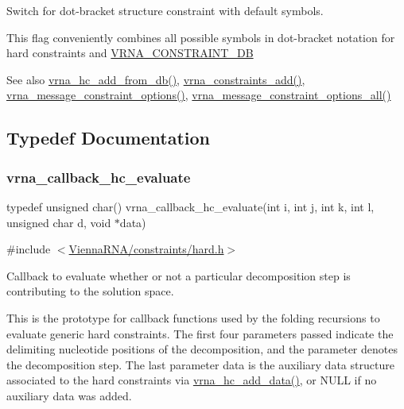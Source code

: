 Switch for dot-\/bracket structure constraint with default symbols. 

This flag conveniently combines all possible symbols in dot-\/bracket notation for hard constraints and \mbox{\hyperlink{group__hard__constraints_ga4bfc2f15c4f261c62a11af9d2aa80c90}{V\+R\+N\+A\+\_\+\+C\+O\+N\+S\+T\+R\+A\+I\+N\+T\+\_\+\+DB}}

\begin{DoxySeeAlso}{See also}
\mbox{\hyperlink{group__hard__constraints_ga5b4de3247b67358080c176b94591a8e6}{vrna\+\_\+hc\+\_\+add\+\_\+from\+\_\+db()}}, \mbox{\hyperlink{group__constraints_ga35a401f680969a556858a8dd5f1d07cc}{vrna\+\_\+constraints\+\_\+add()}}, \mbox{\hyperlink{group__constraints_gaa1f20b53bf09ac2e6b0dbb13f7d89670}{vrna\+\_\+message\+\_\+constraint\+\_\+options()}}, \mbox{\hyperlink{group__constraints_gaec7e13fa0465c2acc7a621d1aecb709f}{vrna\+\_\+message\+\_\+constraint\+\_\+options\+\_\+all()}} 
\end{DoxySeeAlso}


\subsection{Typedef Documentation}
\mbox{\label{group__hard__constraints_gae465f1d4a3d8b6592b38ecbb0d9f613d}} 
\subsubsection{\texorpdfstring{vrna\_callback\_hc\_evaluate}{vrna\_callback\_hc\_evaluate}}
{\footnotesize\ttfamily typedef unsigned char() vrna\+\_\+callback\+\_\+hc\+\_\+evaluate(int i, int j, int k, int l, unsigned char d, void $\ast$data)}



{\ttfamily \#include $<$\mbox{\hyperlink{hard_8h}{Vienna\+R\+N\+A/constraints/hard.\+h}}$>$}



Callback to evaluate whether or not a particular decomposition step is contributing to the solution space. 

This is the prototype for callback functions used by the folding recursions to evaluate generic hard constraints. The first four parameters passed indicate the delimiting nucleotide positions of the decomposition, and the parameter {\ttfamily denotes} the decomposition step. The last parameter {\ttfamily data} is the auxiliary data structure associated to the hard constraints via \mbox{\hyperlink{hard_8h_a128920e0af52e4196a9d59fa13336c7c}{vrna\+\_\+hc\+\_\+add\+\_\+data()}}, or N\+U\+LL if no auxiliary data was added.

